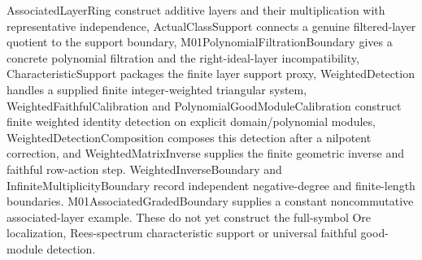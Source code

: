 AssociatedLayerRing construct additive layers and their multiplication with representative independence, ActualClassSupport connects a genuine filtered-layer quotient to the support boundary, M01PolynomialFiltrationBoundary gives a concrete polynomial filtration and the right-ideal-layer incompatibility, CharacteristicSupport packages the finite layer support proxy, WeightedDetection handles a supplied finite integer-weighted triangular system, WeightedFaithfulCalibration and PolynomialGoodModuleCalibration construct finite weighted identity detection on explicit domain/polynomial modules, WeightedDetectionComposition composes this detection after a nilpotent correction, and WeightedMatrixInverse supplies the finite geometric inverse and faithful row-action step. WeightedInverseBoundary and InfiniteMultiplicityBoundary record independent negative-degree and finite-length boundaries. M01AssociatedGradedBoundary supplies a constant noncommutative associated-layer example. These do not yet construct the full-symbol Ore localization, Rees-spectrum characteristic support or universal faithful good-module detection.


